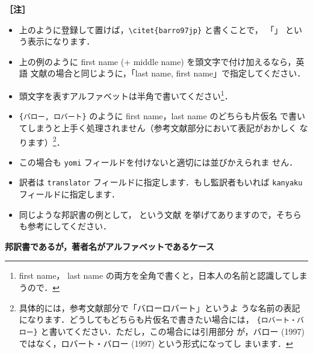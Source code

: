 \documentclass[a4j,10pt]{jarticle}
\begin{document}
\noindent \textbf{［注］} 
\begin{itemize}
 \item 上のように登録して置けば，\verb|\citet{barro97jp}| と書くことで，
       「\citet{barro97jp}」 という表示になります．
 \item 上の例のように first name (+ middle name) を頭文字で付け加えるなら，英語
       文献の場合と同じように，「last name, first name」で指定してください．
 \item 頭文字を表すアルファベットは半角で書いてください\footnote{first name，
       last name の両方を全角で書くと，日本人の名前と認識してしまうので．}．
 \item \verb|{バロー, ロバート}| のように first name，last name のどちらも片仮名
       で書いてしまうと上手く処理されません（参考文献部分において表記がおかしく
       なります）\footnote{具体的には，参考文献部分で「バローロバート」というよ
       うな名前の表記になります．どうしてもどちらも片仮名で書きたい場合には，
       \verb|{ロバート・バロー}| と書いてください．ただし，この場合には引用部分
       が，バロー (1997) ではなく，ロバート・バロー (1997) という形式になってし
       まいます．}．
 \item この場合も \texttt{yomi} フィールドを付けないと適切には並びかえられま
       せん．
 \item 訳者は \texttt{translator} フィールドに指定します．もし監訳者もいれば
       \texttt{kanyaku} フィールドに指定します．
 \item 同じような邦訳書の例として，\cite{markusen99jp:trade_vol_1} という文献
       を挙げてありますので，そちらも参考にしてください．
\end{itemize}

\vspace*{1em}

\noindent \textbf{邦訳書であるが，著者名がアルファベットであるケース}
\end{document}
